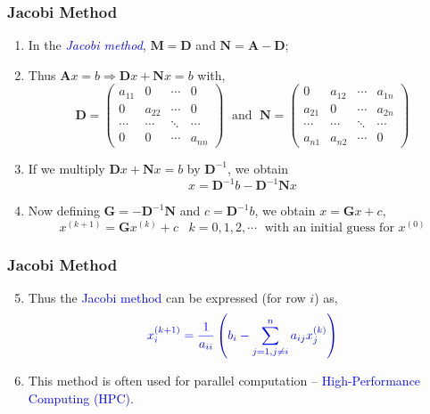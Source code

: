 \documentclass[10pt,compress]{beamer}
\begin{document}
\begin{frame}
  \frametitle{Jacobi Method} 
  \begin{enumerate}
     \item <1-> In the \textcolor{blue}{\it Jacobi method}, $\bm{M}=\bm{D}$ and $\bm{N}=\bm{A}-\bm{D}$;
     \item <2-> Thus $\bm{A}x=b \Longrightarrow \bm{D}x+\bm{N}x=b$ with,
       \begin{displaymath}
          \bm{D}=\begin{pmatrix}a_{11} & 0  & \cdots & 0 \\ 0 & a_{22} & \cdots & 0 \\ \cdots & \cdots & \ddots & \cdots \\ 0 & 0 & \cdots & a_{nn}\end{pmatrix}\;\text{ and }\; \bm{N} = \begin{pmatrix} 0 & a_{12} & \cdots & a_{1n} \\ a_{21} & 0 & \cdots & a_{2n} \\ \cdots & \cdots & \ddots & \cdots \\ a_{n1} & a_{n2} & \cdots & 0 \end{pmatrix}  
       \end{displaymath}
     \item <3-> If we multiply $\bm{D}x+\bm{N}x=b$ by $\bm{D}^{-1}$, we obtain 
        \begin{displaymath}
          x = \bm{D}^{-1}b-\bm{D}^{-1}\bm{N}x
        \end{displaymath}
     \item <4-> Now defining $\bm{G}=-\bm{D}^{-1}\bm{N}$ and $c=\bm{D}^{-1}b$, we obtain $x = \bm{G}x + c$,
        \begin{displaymath}
          x^{(k+1)} = \bm{G}x^{(k)} + c \;\;\; k = 0, 1, 2, \cdots \;\text { with an initial guess for } x^{(0)}  
        \end{displaymath}
  \end{enumerate}
\end{frame}


\begin{frame}
  \frametitle{Jacobi Method} 
  \begin{enumerate}
  \setcounter{enumi}{4}
     \item <1-> Thus the \textcolor{blue}{Jacobi method} can be expressed (for row $i$) as,
         \begin{equation} 
            \textcolor{blue}{x_{i}^{(k+1)} = \frac{1}{a_{ii}}\left(b_{i}-\sum\limits_{j=1,j\neq i}^{n}a_{ij}x_{j}^{(k)}\right)}
         \end{equation}
     \item <2-> This method is often used for parallel computation -- \textcolor{blue}{High-Performance Computing (HPC)}.
  \end{enumerate}
\end{frame}
\end{document}
